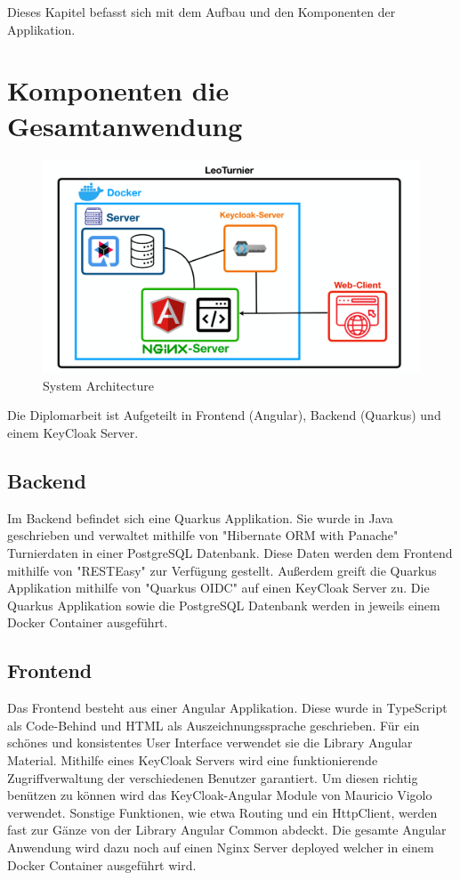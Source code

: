 Dieses Kapitel befasst sich mit dem Aufbau und den Komponenten der Applikation.

\section{Komponenten die Gesamtanwendung}

\begin{figure}[H]
    \includegraphics[scale=0.30]{pics/system_architecture_2.png}
    \caption{System Architecture}
\end{figure}

Die Diplomarbeit ist Aufgeteilt in Frontend (Angular), Backend (Quarkus) und einem KeyCloak Server. 

\subsection{Backend}

Im Backend befindet sich eine Quarkus Applikation. Sie wurde in Java geschrieben und verwaltet mithilfe von "Hibernate ORM with Panache" Turnierdaten in einer PostgreSQL Datenbank.
Diese Daten werden dem Frontend mithilfe von "RESTEasy" zur Verfügung gestellt. Außerdem greift die Quarkus Applikation mithilfe von "Quarkus OIDC" auf einen KeyCloak Server zu. 
Die Quarkus Applikation sowie die PostgreSQL Datenbank werden in jeweils einem Docker Container ausgeführt.

\subsection{Frontend}

Das Frontend besteht aus einer Angular Applikation. Diese wurde in TypeScript als Code-Behind und HTML als Auszeichnungssprache geschrieben. Für ein schönes und konsistentes User Interface
verwendet sie die Library Angular Material. Mithilfe eines KeyCloak Servers wird eine funktionierende Zugriffverwaltung der verschiedenen Benutzer garantiert.
Um diesen richtig benützen zu können wird das KeyCloak-Angular Module von Mauricio Vigolo \cite{sysarch-keycloak-angular-1} verwendet. Sonstige Funktionen, wie etwa Routing und ein HttpClient, werden fast zur Gänze von der Library
Angular Common abdeckt.
Die gesamte Angular Anwendung wird dazu noch auf einen Nginx Server deployed welcher in einem Docker Container ausgeführt wird. 

